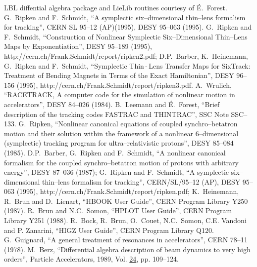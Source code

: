 \documentclass[a4paper,11pt]{report}
\begin{document}
\begin{thebibliography}{99}
%
 LBL diffential algebra package and LieLib routines
  courtesy of \'{E}.~Forest. 
%
 G.~Ripken and F.~Schmidt, ``A symplectic
  six--dimensional thin--lens formalism for tracking'', CERN SL 95--12
  (AP)(1995), DESY 95--063 (1995).  
  G.~Ripken and F.~Schmidt, ``Construction of Nonlinear Symplectic
  Six--Dimensional Thin--Lens Maps by Exponentiation'', DESY 95--189
  (1995),
  {http://cern.ch/Frank.Schmidt/report/ripken2.pdf}; D.P.~Barber,
  K.~Heinemann, G.~Ripken and F.~Schmidt, ``Symplectic Thin\,-\,Lens
  Transfer Maps for SixTrack: Treatment of Bending Magnets in Terms of
  the Exact Hamiltonian'', DESY 96--156 (1995),
  {http://cern.ch/Frank.Schmidt/report/ripken3.pdf}.  
%
 A.~Wrulich, ``RACETRACK, A computer code for the
  simulation of nonlinear motion in accelerators'', DESY 84--026
  (1984).  
%
 B.~Leemann and \'{E}.~Forest, ``Brief
  description of the tracking codes FASTRAC and THINTRAC'', SSC Note
  SSC--133.  
%
 G.~Ripken, ``Nonlinear canonical
  equations of coupled synchro--betatron motion and their solution
  within the framework of a nonlinear 6--dimensional (symplectic)
  tracking program for ultra--relativistic protons'', DESY 85--084
  (1985).  
%
 D.P.~Barber, G.~Ripken and F.~Schmidt,
  ``A nonlinear canonical formalism for the coupled
  synchro--betatron motion of protons with arbitrary energy'', DESY
  87--036 (1987); G.~Ripken and F.~Schmidt, ``A symplectic
  six--dimensional thin--lens formalism for tracking'', CERN/SL/95--12
  (AP), DESY 95--063 (1995),
  {http://cern.ch/Frank.Schmidt/report/ripken.pdf}; K.~Heinemann,
%
  R.~Brun and D.~Lienart, ``HBOOK User Guide'', CERN Program Library
  Y250 (1987).  
%
 R.~Brun and N.C.~Somon, ``HPLOT User
  Guide'', CERN Program Library Y251 (1988).  
%
 R.~Bock,
  R.~Brun, O.~Couet, N.C.~Somon, C.E. Vandoni and P. Zanarini, ``HIGZ
  User Guide'', CERN Program Library Q120.  
%
  G.~Guignard, ``A general treatment of resonances in accelerators'',
  CERN 78--11 (1978).  
%
 M.~Berz, ``Differential
  algebra description of beam dynamics to very high orders'', Particle
  Accelerators, 1989, Vol. \underline{24}, pp. 109--124.

\end{thebibliography}
\end{document}
